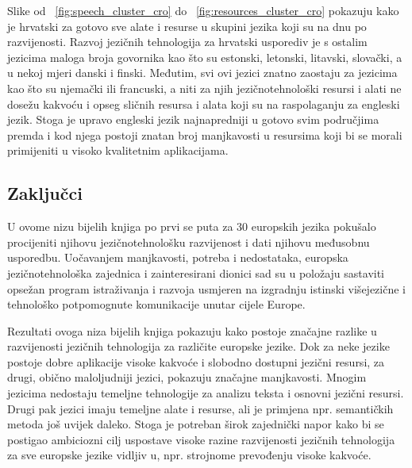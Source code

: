 \begin{multicols}{2}
\bigskip
Slike od ~\ref{fig:speech_cluster_cro} do ~\ref{fig:resources_cluster_cro} pokazuju kako je hrvatski za gotovo sve alate i resurse u skupini jezika koji su na dnu po razvijenosti. Razvoj jezičnih tehnologija za hrvatski usporediv je s ostalim jezicima maloga broja govornika kao što su estonski, letonski, litavski, slovački, a u nekoj mjeri danski i finski. Međutim, svi ovi jezici znatno zaostaju za jezicima kao što su njemački ili francuski, a niti za njih jezičnotehnološki resursi i alati ne dosežu kakvoću i opseg sličnih resursa i alata koji su na raspolaganju za engleski jezik. Stoga je upravo engleski jezik najnapredniji u gotovo svim područjima premda i kod njega postoji znatan broj manjkavosti u resursima koji bi se morali primijeniti u visoko kvalitetnim aplikacijama.
\vfill

\subsection{Zaključci}

U ovome nizu bijelih knjiga po prvi se puta za 30 europskih jezika pokušalo procijeniti njihovu jezičnotehnološku razvijenost i dati njihovu međusobnu usporedbu. Uočavanjem manjkavosti, potreba i nedostataka, europska jezičnotehnološka zajednica i zainteresirani dionici sad su u položaju sastaviti opsežan program istraživanja i razvoja usmjeren na izgradnju istinski višejezične i tehnološko potpomognute komunikacije unutar cijele Europe.

Rezultati ovoga niza bijelih knjiga pokazuju kako postoje značajne razlike u razvijenosti jezičnih tehnologija za različite europske jezike. Dok za neke jezike postoje dobre aplikacije visoke kakvoće i slobodno dostupni jezični resursi, za drugi, obično maloljudniji jezici, pokazuju značajne manjkavosti. Mnogim jezicima nedostaju temeljne tehnologije za analizu teksta i osnovni jezični resursi. Drugi pak jezici imaju temeljne alate i resurse, ali je primjena npr. semantičkih metoda još uvijek daleko. Stoga je potreban širok zajednički napor kako bi se postigao ambiciozni cilj uspostave visoke razine razvijenosti jezičnih tehnologija za sve europske jezike vidljiv u, npr. strojnome prevođenju visoke kakvoće.


\end{multicols}
